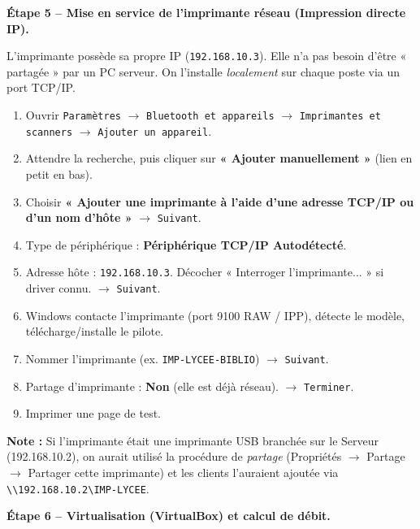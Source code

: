 \documentclass[11pt]{article}
\begin{document}
\begin{exoresolu}
\textbf{Étape 5 -- Mise en service de l'imprimante réseau (Impression directe IP).}

L'imprimante possède sa propre IP (\texttt{192.168.10.3}). Elle n'a pas besoin d'être « partagée » par un PC serveur. On l'installe \emph{localement} sur chaque poste via un port TCP/IP.

\begin{methode}
\begin{enumerate}
\item Ouvrir \texttt{Paramètres} $\rightarrow$ \texttt{Bluetooth et appareils} $\rightarrow$ \texttt{Imprimantes et scanners} $\rightarrow$ \texttt{Ajouter un appareil}.
\item Attendre la recherche, puis cliquer sur \textbf{« Ajouter manuellement »} (lien en petit en bas).
\item Choisir \textbf{« Ajouter une imprimante à l'aide d'une adresse TCP/IP ou d'un nom d'hôte »} $\rightarrow$ \texttt{Suivant}.
\item Type de périphérique : \textbf{Périphérique TCP/IP Autodétecté}.
\item Adresse hôte : \texttt{192.168.10.3}. Décocher « Interroger l'imprimante... » si driver connu. $\rightarrow$ \texttt{Suivant}.
\item Windows contacte l'imprimante (port 9100 RAW / IPP), détecte le modèle, télécharge/installe le pilote.
\item Nommer l'imprimante (ex. \texttt{IMP-LYCEE-BIBLIO}) $\rightarrow$ \texttt{Suivant}.
\item Partage d'imprimante : \textbf{Non} (elle est déjà réseau). $\rightarrow$ \texttt{Terminer}.
\item Imprimer une page de test.
\end{enumerate}
\end{methode}

\textbf{Note :} Si l'imprimante était une imprimante USB branchée sur le Serveur (192.168.10.2), on aurait utilisé la procédure de \emph{partage} (Propriétés $\rightarrow$ Partage $\rightarrow$ Partager cette imprimante) et les clients l'auraient ajoutée via \texttt{\textbackslash\textbackslash 192.168.10.2\textbackslash IMP-LYCEE}.

\textbf{Étape 6 -- Virtualisation (VirtualBox) et calcul de débit.}


\end{exoresolu}
\end{document}
